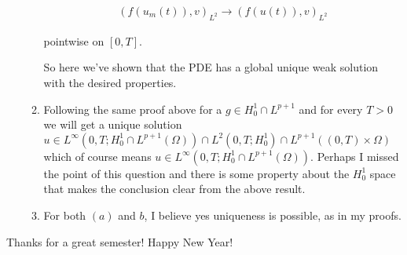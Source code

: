 \documentclass[12pt, letterpaper]{article}
\begin{document}
\begin{enumerate}
\begin{enumerate}
\begin{align}
(f(u_m(t)),v)_{L^2}\rightarrow(f(u(t)),v)_{L^2}
\end{align}

pointwise on $[0,T]$.

So here we've shown that the PDE has a global unique weak solution with the desired properties.

\item Following the same proof above for a $g\in H_0^1\cap L^{p+1}$ and for every $T>0$ we will get a unique solution $u\in L^\infty(0,T;H_0^1\cap L^{p+1}(\Omega))\cap L^2(0,T;H^1_0)\cap L^{p+1}((0,T)\times\Omega)$ which of course means $u\in L^\infty(0,T;H_0^1\cap L^{p+1}(\Omega))$. Perhaps I missed the point of this question and there is some property about the $H_0^1$ space that makes the conclusion clear from the above result.

\item For both $(a)$ and $b$, I believe yes uniqueness is possible, as in my proofs.

\end{enumerate}

\end{enumerate}

Thanks for a great semester! Happy New Year!
\end{document}
